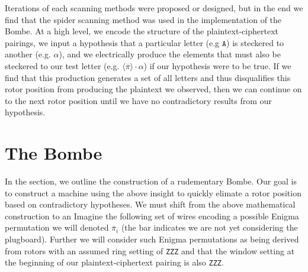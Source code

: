 Iterations of each scanning methods were proposed or designed, but in
the end we find that the spider scanning method was used in the
implementation of the Bombe. At a high level, we encode the structure
of the plaintext-ciphertext pairings, we input a hypothesis that a particular
letter (e.g $\texttt{A}$) is steckered to another (e.g. $\alpha$), and we
electrically produce the elements that must also be steckered to our test letter
(e.g. $\langle\overline{\pi}\rangle\cdot\alpha$) if our hypothesis
were to be true. If we find that this production generates a set of
all letters and thus disqualifies this rotor position from producing
the plaintext we observed, then we can continue on to the next rotor
position until we have no contradictory results from our hypothesis.

\section{The Bombe}

In the section, we outline the construction of a rudementary Bombe.
Our goal is to construct a machine using the above insight to quickly
elimate a rotor position based on contradictory hypotheses. We must shift from the above mathematical construction to an
Imagine the following set of wires encoding a possible Enigma
permutation we will denoted $\overline\pi_i$ (the bar
indicates we are not yet considering the plugboard). Further we will consider such Enigma permutations as being derived from rotors with an assumed ring setting of \texttt{ZZZ} and that the window setting at the beginning of our plaintext-ciphertext pairing is also \texttt{ZZZ}.


